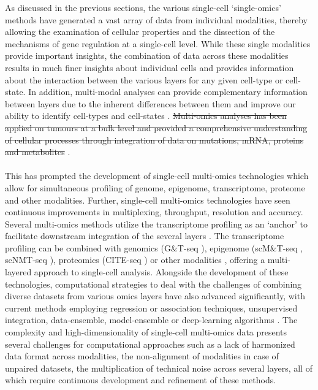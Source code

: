 As discussed in the previous sections, the various single-cell ‘single-omics’ methods have generated a vast array of data from individual modalities, thereby allowing the examination of cellular properties and the dissection of the mechanisms of gene regulation at a single-cell level. While these single modalities provide important insights, the combination of data across these modalities results in much finer insights about individual cells and provides information about the interaction between the various layers for any given cell-type or cell-state. In addition, multi-modal analyses can provide complementary information between layers due to the inherent differences between them and improve our ability to identify cell-types and cell-states \textbf{\cite{flynn_single-cell_2023}}. \st{Multi-omics analyses has been applied on tumours at a bulk level and provided a comprehensive understanding of cellular processes through integration of data on mutations, mRNA, proteins and metabolites} \textbf{\cite{lee_single-cell_2020}}.
\\\\
This has prompted the development of single-cell multi-omics technologies which allow for simultaneous profiling of genome, epigenome, transcriptome, proteome and other modalities. Further, single-cell multi-omics technologies have seen continuous improvements in multiplexing, throughput, resolution and accuracy. Several multi-omics methods utilize the transcriptome profiling as an ‘anchor’ to facilitate downstream integration of the several layers \textbf{\cite{baysoy_technological_2023}}. The transcriptome profiling can be combined with genomics (G\&T-seq \textbf{\cite{macaulay_gt-seq_2015}}), epigenome (scM\&T-seq \textbf{\cite{angermueller_parallel_2016}}, scNMT-seq \textbf{\cite{clark_scnmt-seq_2018}}), proteomics (CITE-seq \textbf{\cite{stoeckius_simultaneous_2017}}) or other modalities \textbf{\cite{dixit_perturb-seq_2016,singh_high-throughput_2019}}, offering a multi-layered approach to single-cell analysis. Alongside the development of these technologies, computational strategies to deal with the challenges of combining diverse datasets from various omics layers have also advanced significantly, with current methods employing regression or association techniques, unsupervised integration, data-ensemble, model-ensemble \textbf{\cite{vahabi_unsupervised_2022, stanojevic_computational_2022}} or deep-learning algorithms \textbf{\cite{baysoy_technological_2023,athaya_multimodal_2023}}. The complexity and high-dimensionality of single-cell multi-omics data presents several challenges for computational approaches such as a lack of harmonized data format across modalities, the non-alignment of modalities in case of unpaired datasets, the multiplication of technical noise across several layers, all of which require continuous development and refinement of these methods.
